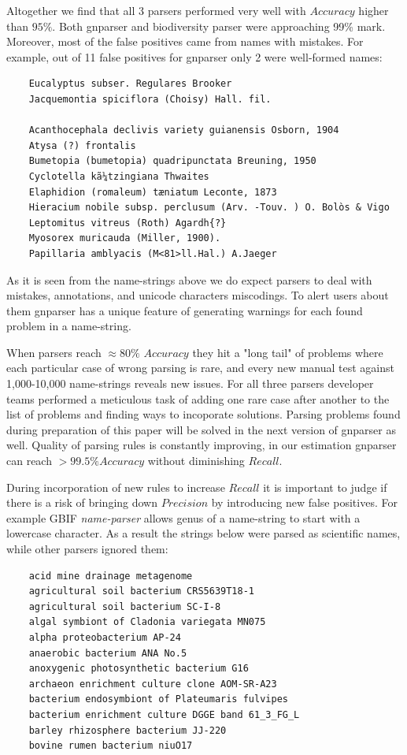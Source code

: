 \documentclass{bmcart}
\begin{document}
Altogether we find that all 3 parsers performed very well with $Accuracy$
higher than $95\%$. Both gnparser and biodiversity parser were approaching
99\% mark. Moreover, most of the false positives came from names with
mistakes. For example, out of 11 false positives for gnparser only 2 were
well-formed names:

\vspace{0.5cm}
\begin{verbatim}
    Eucalyptus subser. Regulares Brooker
    Jacquemontia spiciflora (Choisy) Hall. fil.

    Acanthocephala declivis variety guianensis Osborn, 1904
    Atysa (?) frontalis
    Bumetopia (bumetopia) quadripunctata Breuning, 1950
    Cyclotella kã¼tzingiana Thwaites
    Elaphidion (romaleum) tæniatum Leconte, 1873
    Hieracium nobile subsp. perclusum (Arv. -Touv. ) O. Bolòs & Vigo
    Leptomitus vitreus (Roth) Agardh{?}
    Myosorex muricauda (Miller, 1900).
    Papillaria amblyacis (M<81>ll.Hal.) A.Jaeger
\end{verbatim}
\vspace{0.5cm}

As it is seen from the name-strings above we do expect parsers to deal with
mistakes, annotations, and unicode characters miscodings. To alert users
about them gnparser has a unique feature of generating warnings for each found
problem in a name-string.

When parsers reach $\approx80\%$ $Accuracy$ they hit a "long tail" of problems
where each particular case of wrong parsing is rare, and every new manual test
against 1,000-10,000 name-strings reveals new issues. For all three parsers
developer teams performed a meticulous task of adding one rare case after
another to the list of problems and finding ways to incoporate solutions.
Parsing problems found during preparation of this paper will be solved in the
next version of gnparser as well. Quality of parsing rules is constantly
improving, in our estimation gnparser can reach $> 99.5\% Accuracy$
without diminishing $Recall$.

During incorporation of new rules to increase $Recall$ it is important to judge
if there is a risk of bringing down $Precision$ by introducing new false
positives.  For example GBIF \textit{name-parser} allows genus of a name-string
to start with a lowercase character. As a result the strings below were parsed
as scientific names, while other parsers ignored them:


\vspace{0.5cm}
\begin{verbatim}
    acid mine drainage metagenome
    agricultural soil bacterium CRS5639T18-1
    agricultural soil bacterium SC-I-8
    algal symbiont of Cladonia variegata MN075
    alpha proteobacterium AP-24
    anaerobic bacterium ANA No.5
    anoxygenic photosynthetic bacterium G16
    archaeon enrichment culture clone AOM-SR-A23
    bacterium endosymbiont of Plateumaris fulvipes
    bacterium enrichment culture DGGE band 61_3_FG_L
    barley rhizosphere bacterium JJ-220
    bovine rumen bacterium niuO17
\end{verbatim}
\vspace{0.5cm}
\end{document}
